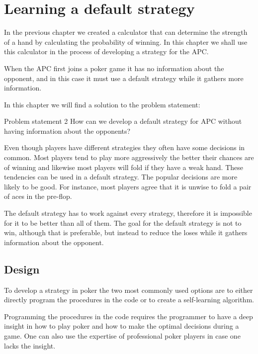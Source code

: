 \section{Learning a default strategy}
\label{sec:part2}
In the previous chapter we created a calculator that can determine the strength of a hand by calculating the probability of winning. In this chapter we shall use this calculator in the process of developing a strategy for the APC.

When the APC first joins a poker game it has no information about the opponent, and in this case it must use a default strategy while it gathers more information.

In this chapter we will find a solution to the problem statement:

\vspace{4mm}
\begin{statementBox2}{Problem statement 2}
How can we develop a default strategy for APC without having information about the opponents?
\end{statementBox2}
\vspace{4mm}

Even though players have different strategies they often have some decisions in common. Most players tend to play more aggressively the better their chances are of winning and likewise most players will fold if they have a weak hand. These tendencies can be used in a default strategy. The popular decisions are more likely to be good. For instance, most players agree that it is unwise to fold a pair of aces in the pre-flop. 

The default strategy has to work against every strategy, therefore it is impossible for it to be better than all of them. The goal for the default strategy is not to win, although that is preferable, but instead to reduce the loses while it gathers information about the opponent.

\subsection{Design}
To develop a strategy in poker the two most commonly used options are to either directly program the procedures in the code or to create a self-learning algorithm. 

Programming the procedures in the code requires the programmer to have a deep insight in how to play poker and how to make the optimal decisions during a game. One can also use the expertise of professional poker players in case one lacks the insight.

